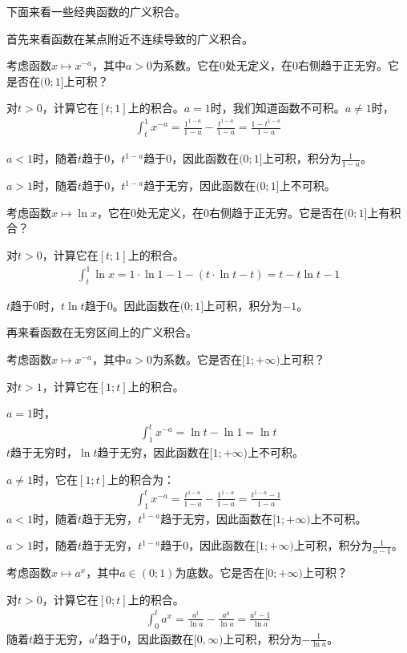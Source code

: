 \documentclass[12pt,UTF8]{ctexbook}
\theoremstyle{definition}
\theoremstyle{plain}
\begin{document}
下面来看一些经典函数的广义积合。

首先来看函数在某点附近不连续导致的广义积合。

考虑函数$x\mapsto x^{-a}$，其中$a>0$为系数。它在$0$处无定义，在$0$右侧趋于正无穷。它是否在$(0;1]$上可积？

对$t>0$，计算它在$[t;1]$上的积合。$a=1$时，我们知道函数不可积。$a\neq 1$时，
\begin{align*}
    \int_t^1 x^{-a} = \frac{1^{1-a}}{1 - a} - \frac{t^{1-a}}{1 - a} = \frac{1 - t^{1-a}}{1-a} 
\end{align*}

$a<1$时，随着$t$趋于$0$，$t^{1-a}$趋于$0$，因此函数在$(0;1]$上可积，积分为$\frac{1}{1-a}$。

$a>1$时，随着$t$趋于$0$，$t^{1-a}$趋于无穷，因此函数在$(0;1]$上不可积。

考虑函数$x\mapsto \ln{x}$，它在$0$处无定义，在$0$右侧趋于正无穷。它是否在$(0;1]$上有积合？

对$t>0$，计算它在$[t;1]$上的积合。
\begin{align*}
    \int_t^1 \ln{x} = 1\cdot \ln{1} - 1 - (t\cdot\ln{t} - t)= t - t\ln{t} - 1
\end{align*}

$t$趋于$0$时，$t\ln{t}$趋于$0$。因此函数在$(0;1]$上可积，积分为$-1$。

再来看函数在无穷区间上的广义积合。

考虑函数$x\mapsto x^{-a}$，其中$a>0$为系数。它是否在$[1;+\infty)$上可积？

对$t>1$，计算它在$[1;t]$上的积合。

$a=1$时，
\begin{align*}
    \int_1^t x^{-a} = \ln{t} - \ln{1} = \ln{t} 
\end{align*}
$t$趋于无穷时，$\ln{t}$趋于无穷，因此函数在$[1;+\infty)$上不可积。

$a\neq 1$时，它在$[1;t]$上的积合为：
\begin{align*}
    \int_1^t x^{-a} = \frac{t^{1-a}}{1 - a} - \frac{1^{1-a}}{1 - a} = \frac{t^{1-a} - 1}{1-a} 
\end{align*}
$a<1$时，随着$t$趋于无穷，$t^{1-a}$趋于无穷，因此函数在$[1;+\infty)$上不可积。

$a>1$时，随着$t$趋于无穷，$t^{1-a}$趋于$0$，因此函数在$[1;+\infty)$上可积，积分为$\frac{1}{a-1}$。

考虑函数$x\mapsto a^x$，其中$a\in(0;1)$为底数。它是否在$[0;+\infty)$上可积？

对$t>0$，计算它在$[0;t]$上的积合。
\begin{align*}
    \int_0^t a^x = \frac{a^t}{\ln{a}} - \frac{a^0}{\ln{a}} = \frac{a^t - 1}{\ln{a}}
\end{align*}
随着$t$趋于无穷，$a^t$趋于$0$，因此函数在$[0,\infty)$上可积，积分为$-\frac{1}{\ln{a}}$。
\end{document}
